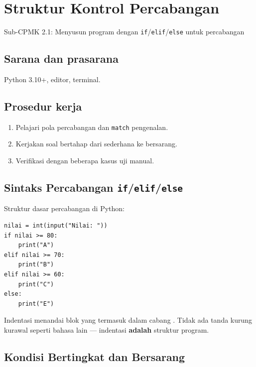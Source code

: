 ﻿\documentclass[../main.tex]{subfiles}
\begin{document}
\chapter{Struktur Kontrol Percabangan}

\begin{subcpmk}
  \item Sub-CPMK 2.1: Menyusun program dengan \texttt{if}/\texttt{elif}/\texttt{else} untuk percabangan
\end{subcpmk}


\section{Sarana dan prasarana}

Python 3.10+, editor, terminal.

\section{Prosedur kerja}

\begin{enumerate}[leftmargin=*]
  \item Pelajari pola percabangan dan \texttt{match} pengenalan.
  \item Kerjakan soal bertahap dari sederhana ke bersarang.
  \item Verifikasi dengan beberapa kasus uji manual.
\end{enumerate}

\section{Sintaks Percabangan \texttt{if}/\texttt{elif}/\texttt{else}}

Struktur dasar percabangan di Python:

\begin{lstlisting}[caption=if / elif / else (Tutorial Python ss4.1)]
nilai = int(input("Nilai: "))
if nilai >= 80:
    print("A")
elif nilai >= 70:
    print("B")
elif nilai >= 60:
    print("C")
else:
    print("E")
\end{lstlisting}

Indentasi menandai blok yang termasuk dalam cabang . Tidak ada tanda kurung kurawal seperti bahasa lain --- indentasi \textbf{adalah} struktur program.

\section{Kondisi Bertingkat dan Bersarang}
\end{document}
